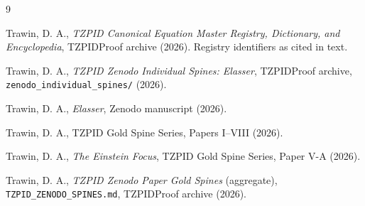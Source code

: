 \documentclass[11pt]{article}
\theoremstyle{remark}
\begin{document}
\begin{thebibliography}{9}

 Trawin, D. A., \emph{TZPID Canonical Equation Master Registry, Dictionary, and Encyclopedia}, TZPIDProof archive (2026). Registry identifiers as cited in text.

 Trawin, D. A., \emph{TZPID Zenodo Individual Spines: Elasser}, TZPIDProof archive, \texttt{zenodo\_individual\_spines/} (2026).

 Trawin, D. A., \emph{Elasser}, Zenodo manuscript (2026).

 Trawin, D. A., TZPID Gold Spine Series, Papers I--VIII (2026).

 Trawin, D. A., \emph{The Einstein Focus}, TZPID Gold Spine Series, Paper V-A (2026).

 Trawin, D. A., \emph{TZPID Zenodo Paper Gold Spines} (aggregate), \texttt{TZPID\_ZENODO\_SPINES.md}, TZPIDProof archive (2026).

\end{thebibliography}
\end{document}
